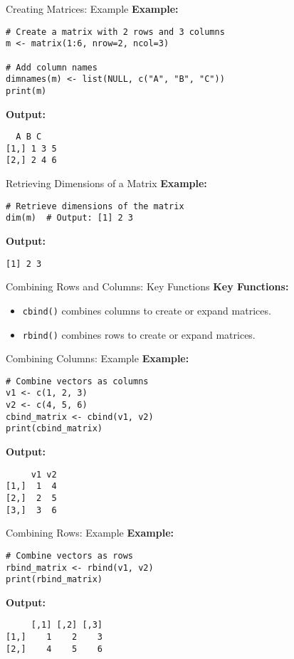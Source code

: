 \documentclass{beamer}
\begin{document}
\begin{frame}[fragile]{Creating Matrices: Example}
\textbf{Example:}
\begin{verbatim}
# Create a matrix with 2 rows and 3 columns
m <- matrix(1:6, nrow=2, ncol=3)

# Add column names
dimnames(m) <- list(NULL, c("A", "B", "C"))
print(m)
\end{verbatim}
\textbf{Output:}
\begin{verbatim}
  A B C
[1,] 1 3 5
[2,] 2 4 6
\end{verbatim}
\end{frame}

\begin{frame}[fragile]{Retrieving Dimensions of a Matrix}
\textbf{Example:}
\begin{verbatim}
# Retrieve dimensions of the matrix
dim(m)  # Output: [1] 2 3
\end{verbatim}
\textbf{Output:}
\begin{verbatim}
[1] 2 3
\end{verbatim}
\end{frame}

\begin{frame}[fragile]{Combining Rows and Columns: Key Functions}
\textbf{Key Functions:}
\begin{itemize}
    \item \texttt{cbind()} combines columns to create or expand matrices.
    \item \texttt{rbind()} combines rows to create or expand matrices.
\end{itemize}
\end{frame}

\begin{frame}[fragile]{Combining Columns: Example}
\textbf{Example:}
\begin{verbatim}
# Combine vectors as columns
v1 <- c(1, 2, 3)
v2 <- c(4, 5, 6)
cbind_matrix <- cbind(v1, v2)
print(cbind_matrix)
\end{verbatim}
\textbf{Output:}
\begin{verbatim}
     v1 v2
[1,]  1  4
[2,]  2  5
[3,]  3  6
\end{verbatim}
\end{frame}

\begin{frame}[fragile]{Combining Rows: Example}
\textbf{Example:}
\begin{verbatim}
# Combine vectors as rows
rbind_matrix <- rbind(v1, v2)
print(rbind_matrix)
\end{verbatim}
\textbf{Output:}
\begin{verbatim}
     [,1] [,2] [,3]
[1,]    1    2    3
[2,]    4    5    6
\end{verbatim}
\end{frame}
\end{document}
